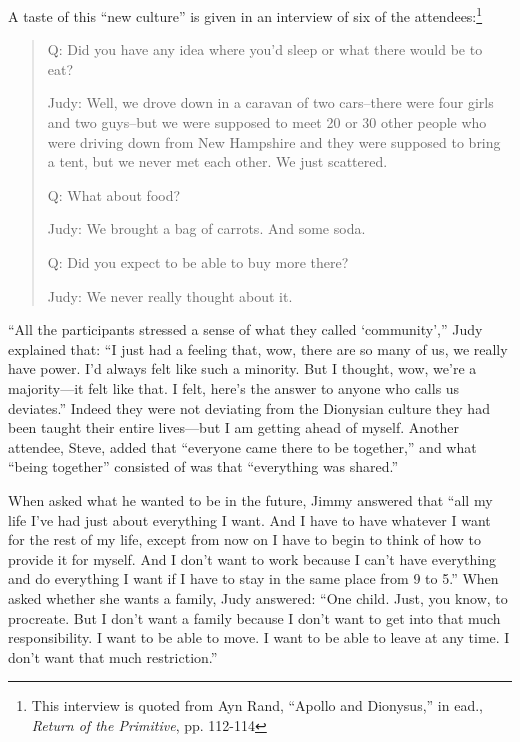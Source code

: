 \documentclass[11pt]{article}
\begin{document}
A taste of this ``new culture'' is given in an interview of six of the attendees:\footnote{This interview is quoted from Ayn Rand, ``Apollo and Dionysus,'' in ead., \emph{Return of the Primitive}, pp. 112-114}
\begin{quote}
Q: Did you have any idea where you'd sleep or what there would be to eat?

Judy: Well, we drove down in a caravan of two cars--there were four girls and two guys--but we were supposed to meet 20 or 30 other people who were driving down from New Hampshire and they were supposed to bring a tent, but we never met each other. We just scattered.

Q: What about food?

Judy: We brought a bag of carrots. And some soda.

Q: Did you expect to be able to buy more there?

Judy: We never really thought about it.
\end{quote}

``All the participants stressed a sense of what they called `community','' Judy explained that: ``I just had a feeling that, wow, there are so many of us, we really have power. I'd always felt like such a minority. But I thought, wow, we're a majority---it felt like that. I felt, here's the answer to anyone who calls us deviates.'' Indeed they were not deviating from the Dionysian culture they had been taught their entire lives---but I am getting ahead of myself. Another attendee, Steve, added that ``everyone came there to be together,'' and what ``being together'' consisted of was that ``everything was shared.''

When asked what he wanted to be in the future, Jimmy answered that ``all my life I've had just about everything I want. And I have to have whatever I want for the rest of my life, except from now on I have to begin to think of how to provide it for myself. And I don't want to work because I can't have everything and do everything I want if I have to stay in the same place from 9 to 5.'' When asked whether she wants a family, Judy answered: ``One child. Just, you know, to procreate. But I don't want a family because I don't want to get into that much responsibility. I want to be able to move. I want to be able to leave at any time. I don't want that much restriction.''
\end{document}
